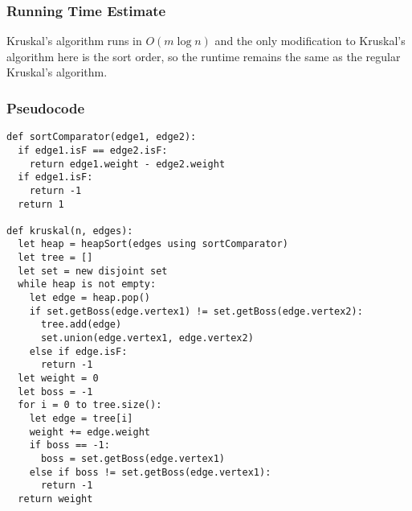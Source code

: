\documentclass{math}
\begin{document}
\subsubsection*{Running Time Estimate}
Kruskal's algorithm runs in \( O(m\log n) \) and the only modification to
Kruskal's algorithm here is the sort order, so the runtime remains the same as
the regular Kruskal's algorithm.

\subsubsection*{Pseudocode}
\begin{lstlisting}
def sortComparator(edge1, edge2):
  if edge1.isF == edge2.isF:
    return edge1.weight - edge2.weight
  if edge1.isF:
    return -1
  return 1

def kruskal(n, edges):
  let heap = heapSort(edges using sortComparator)
  let tree = []
  let set = new disjoint set
  while heap is not empty:
    let edge = heap.pop()
    if set.getBoss(edge.vertex1) != set.getBoss(edge.vertex2):
      tree.add(edge)
      set.union(edge.vertex1, edge.vertex2)
    else if edge.isF:
      return -1
  let weight = 0
  let boss = -1
  for i = 0 to tree.size():
    let edge = tree[i]
    weight += edge.weight
    if boss == -1:
      boss = set.getBoss(edge.vertex1)
    else if boss != set.getBoss(edge.vertex1):
      return -1
  return weight
\end{lstlisting}
\end{document}
